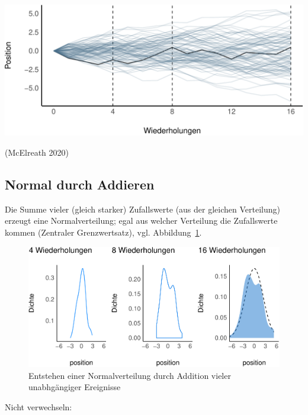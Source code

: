 \documentclass[
  a4paper,
  DIV=11]{scrreprt}
\theoremstyle{definition}
\theoremstyle{remark}
\begin{document}
\includegraphics{./Verteilungen_files/figure-pdf/Normalverteilung-6-1.pdf}

(McElreath 2020)

\hypertarget{normal-durch-addieren}{%
\subsection{Normal durch Addieren}\label{normal-durch-addieren}}

Die Summe vieler (gleich starker) Zufallswerte (aus der gleichen
Verteilung) erzeugt eine Normalverteilung; egal aus welcher Verteilung
die Zufallswerte kommen (Zentraler Grenzwertsatz), vgl.
Abbildung~\ref{fig-fussball}.

\begin{figure}

{\centering \includegraphics[width=1\textwidth,height=\textheight]{./Verteilungen_files/figure-pdf/fig-fussball-1.pdf}

}

\caption{\label{fig-fussball}Entstehen einer Normalverteilung durch
Addition vieler unabhgängiger Ereignisse}

\end{figure}

Nicht verwechseln:
\end{document}
